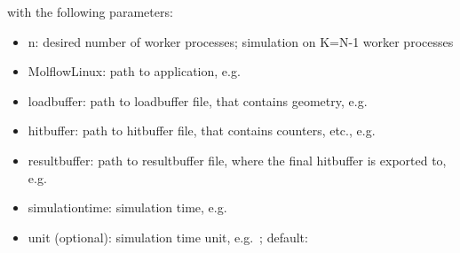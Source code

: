 \smallskip
with the following parameters:
\begin{itemize}[noitemsep,topsep=0pt]
\item n: desired number of worker processes; simulation on K=N-1 worker processes
\item MolflowLinux: path to application, e.g.\ 
\item loadbuffer: path to loadbuffer file, that contains geometry, e.g.\ 
\item hitbuffer: path to hitbuffer file, that contains counters, etc., e.g.\ 
\item resultbuffer: path to resultbuffer file, where the final hitbuffer is exported to,\\ e.g.\ 
\item simulationtime: simulation time, e.g.\ 
\item unit (optional): simulation time unit, e.g.\ ; default: 
\end{itemize}


